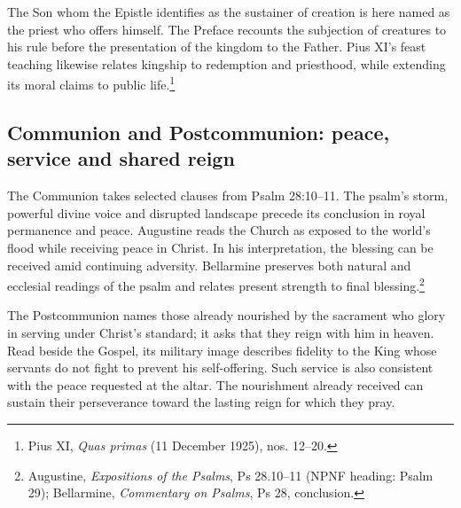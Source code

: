 The Son whom the Epistle identifies as the sustainer of creation is here named as the priest who offers himself. The Preface recounts the subjection of creatures to his rule before the presentation of the kingdom to the Father. Pius XI's feast teaching likewise relates kingship to redemption and priesthood, while extending its moral claims to public life.\footnote{Pius XI, \emph{Quas primas} (11 December 1925), nos. 12--20.}

\subsection{Communion and Postcommunion: peace, service and shared reign}
The Communion takes selected clauses from Psalm 28:10--11. The psalm's storm, powerful divine voice and disrupted landscape precede its conclusion in royal permanence and peace. Augustine reads the Church as exposed to the world's flood while receiving peace in Christ. In his interpretation, the blessing can be received amid continuing adversity. Bellarmine preserves both natural and ecclesial readings of the psalm and relates present strength to final blessing.\footnote{Augustine, \emph{Expositions of the Psalms}, Ps 28.10--11 (NPNF heading: Psalm 29); Bellarmine, \emph{Commentary on Psalms}, Ps 28, conclusion.}

The Postcommunion names those already nourished by the sacrament who glory in serving under Christ's standard; it asks that they reign with him in heaven. Read beside the Gospel, its military image describes fidelity to the King whose servants do not fight to prevent his self-offering. Such service is also consistent with the peace requested at the altar. The nourishment already received can sustain their perseverance toward the lasting reign for which they pray.
